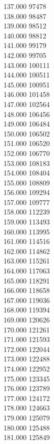 { 137.000	97478 \\
 138.000	98487 \\
 139.000	98512 \\
 140.000	98812 \\
 141.000	99179 \\
 142.000	99705 \\
 143.000	100111 \\
 144.000	100511 \\
 145.000	100951 \\
 146.000	101458 \\
 147.000	102564 \\
 148.000	106456 \\
 149.000	106484 \\
 150.000	106502 \\
 151.000	106520 \\
 152.000	106770 \\
 153.000	108183 \\
 154.000	108404 \\
 155.000	108809 \\
 156.000	109294 \\
 157.000	109777 \\
 158.000	112239 \\
 159.000	113493 \\
 160.000	113995 \\
 161.000	114516 \\
 162.000	114862 \\
 163.000	115261 \\
 164.000	117063 \\
 165.000	118291 \\
 166.000	118658 \\
 167.000	119036 \\
 168.000	119394 \\
 169.000	120626 \\
 170.000	121261 \\
 171.000	121593 \\
 172.000	122044 \\
 173.000	122488 \\
 174.000	122952 \\
 175.000	123345 \\
 176.000	123789 \\
 177.000	124172 \\
 178.000	124663 \\
 179.000	125079 \\
 180.000	125488 \\
 181.000	125849 \\
}
